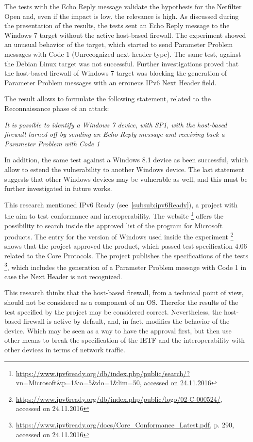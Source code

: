 \documentclass[12pt]{article}
\begin{document}
The tests with the Echo Reply message validate the hypothesis for the Netfilter Open and, even if the impact is low, the relevance is high. As discussed during the presentation of the results, the tests sent an Echo Reply message to the Windows 7 target without the active host-based firewall. The experiment showed an unusual behavior of the target, which started to send Parameter Problem messages with Code 1 (Unrecognized next header type). The same test, against the Debian Linux target was not successful. Further investigations proved that the host-based firewall of Windows 7 target was blocking the generation of Parameter Problem messages with an erroneus IPv6 Next Header field.

The result allows to formulate the following statement, related to the Reconnaissance phase of an attack:

\textit{It is possible to identify a Windows 7 device, with SP1, with the host-based firewall turned off by sending an Echo Reply message and receiving back a Parameter Problem with Code 1}

In addition, the same test against a Windows 8.1 device as been successful, which allow to estend the vulnerability to another Windows device. The last statement suggests that other Windows devices may be vulnerable as well, and this must be further investigated in future works.

This research mentioned IPv6 Ready (see~\cref{subsub:ipv6Ready}), a project with the aim to test conformance and interoperability. The website \footnote{\url{https://www.ipv6ready.org/db/index.php/public/search/?vn=Microsoft&p=1&o=5&do=1&lim=50}, accessed on 24.11.2016} offers the possibility to search inside the approved list of the program for Microsoft products. The entry for the version of Windows used inside the experiment \footnote{\url{https://www.ipv6ready.org/db/index.php/public/logo/02-C-000524/}, accessed on 24.11.2016} shows that the project approved the product, which passed test specification 4.06 related to the Core Protocols. The project publishes the specifications of the tests \footnote{\url{https://www.ipv6ready.org/docs/Core_Conformance_Latest.pdf}, p. 290, accessed on 24.11.2016}, which includes the generation of a Parameter Problem message with Code 1 in case the Next Header is not recognized.

This research thinks that the host-based firewall, from a technical point of view, should not be considered as a component of an OS. Therefor the results of the test specified by the project may be considered correct. Nevertheless, the host-based firewall is active by default, and, in fact, modifies the behavior of the device. Which may be seen as a way to have the approval first, but then use other means to break the specification of the IETF and the interoperability with other devices in terms of network traffic.
\end{document}
